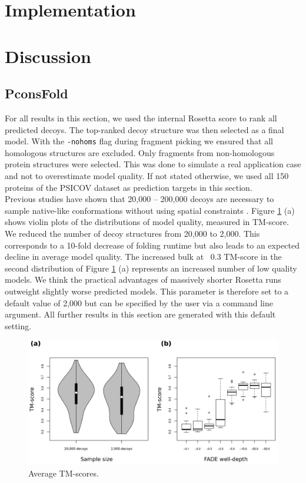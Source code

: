\documentclass{bioinfo}
\begin{document}
\section{Implementation}
\section{Discussion}

\subsection{PconsFold}
For all results in this section, we used the internal Rosetta score to rank all predicted decoys. The top-ranked decoy structure was then selected as a final model. With the {\tt -nohoms} flag during fragment picking we ensured that all homologous structures are excluded. Only fragments from non-homologous protein structures were selected. This was done to simulate a real application case and not to overestimate model quality. If not stated otherwise, we used all 150 proteins of the PSICOV dataset as prediction targets in this section. \\\indent
Previous studies have shown that 20,000 -- 200,000 decoys are necessary to sample native-like conformations without using spatial constraints \cite[]{rosetta@home, rosetta_folding}. Figure \ref{fig:ros} (a) shows violin plots of the distributions of model quality, measured in TM-score. We reduced the number of decoy structures from 20,000 to 2,000. This corresponds to a 10-fold decrease of folding runtime but also leads to an expected decline in average model quality. The increased bulk at ~0.3 TM-score in the second distribution of Figure \ref{fig:ros} (a) represents an increased number of low quality models. We think the practical advantages of massively shorter Rosetta runs outweight slightly worse predicted models. This parameter is therefore set to a default value of 2,000 but can be specified by the user via a command line argument. All further results in this section are generated with this default setting. \\\indent
\begin{figure}[!tpb]%
    \centerline{\includegraphics[scale=0.49]{figures/rosetta.jpg}}
\caption{Average TM-scores.}\label{fig:ros}
\end{figure}
\end{document}

